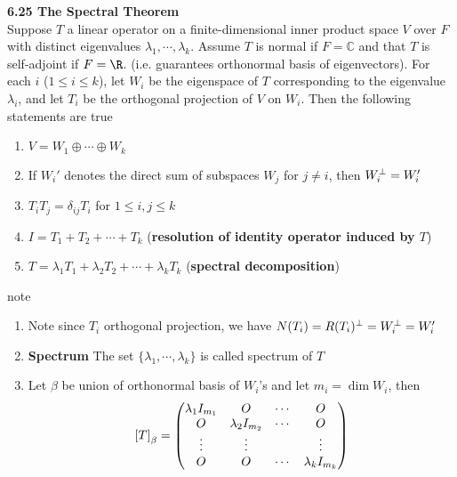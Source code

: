 \documentclass[11pt]{article}
\begin{document}
\begin{theorem*}
    \textbf{6.25 The Spectral Theorem} \\
    Suppose $T$ a linear operator  on a finite-dimensional inner product space $V$ over $F$ with distinct eigenvalues $\lambda_1, \cdots, \lambda_k$. Assume $T$ is normal if $F = \mathbb{C}$ and that $T$ is self-adjoint if $F = \R$. (i.e. guarantees orthonormal basis of eigenvectors). For each $i$ ($1\leq i \leq k$), let $W_i$ be the eigenspace of $T$ corresponding to the eigenvalue $\lambda_i$, and let $T_i$ be the orthogonal projection of $V$ on $W_i$. Then the following statements are true 
    \begin{enumerate}
        \item $V = W_1\oplus \cdots\oplus W_k$ 
        \item If $W_i'$ denotes the direct sum of subspaces $W_j$ for $j\neq i$, then $W_i^{\perp} = W_i'$
        \item $T_i T_j = \delta_{ij} T_i$ for $1\leq i,j\leq k$
        \item $I = T_1 + T_2 + \cdots + T_k$ (\textbf{resolution of identity operator induced by $T$})
        \item $T = \lambda_1 T_1 + \lambda_2 T_2 + \cdots + \lambda_k T_k$ (\textbf{spectral decomposition})
    \end{enumerate}
    note 
    \begin{enumerate}
        \item Note since $T_i$ orthogonal projection, we have $N(T_i) = R(T_i)^{\perp} = W_i^{\perp} = W_i'$
        \item \textbf{Spectrum} The set $\{\lambda_1, \cdots, \lambda_k\}$ is called spectrum of $T$
        \item Let $\beta$ be union of orthonormal basis of $W_i$'s and let $m_i = \dim{W_i}$, then 
        \[
            \left[ T \right]_{\beta} = 
            \begin{pmatrix}
                \lambda_1 I_{m_1} & O & \cdots & O \\ 
                O & \lambda_2 I_{m_2} & \cdots & O \\
                \vdots & \vdots & & \vdots \\
                O & O & \cdots & \lambda_k I_{m_k} \\
            \end{pmatrix}    
        \]
    \end{enumerate}
\end{theorem*}
\end{document}

